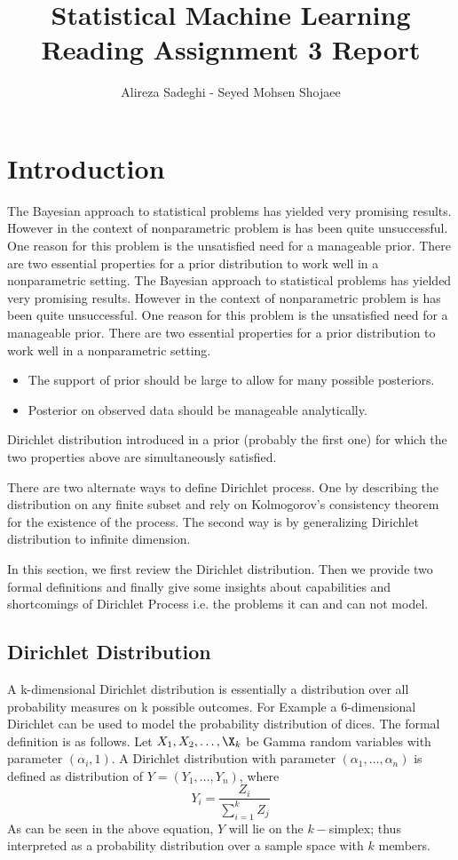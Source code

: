 \documentclass{article}
\title{Statistical Machine Learning \\ Reading Assignment 3 Report}
\author{Alireza Sadeghi - Seyed Mohsen Shojaee}
\begin{document}
\maketitle

\section{Introduction}
The Bayesian approach to statistical problems has yielded very promising results. However in the context
of nonparametric problem is has been quite unsuccessful. One reason for this problem is the unsatisfied need for a manageable prior.
There are two essential properties for a prior distribution to work well in a nonparametric setting.
The Bayesian approach to statistical problems has yielded very promising results. However in the context
of nonparametric problem is has been quite unsuccessful. One reason for this problem is the unsatisfied need for a manageable prior.
There are two essential properties for a prior distribution to work well in a nonparametric setting.
\begin{itemize}
  \item The support of prior should be large to allow for many possible posteriors.
\item Posterior on observed data should be manageable analytically.
\end{itemize}
Dirichlet distribution introduced in \cite{fegusen} a prior
(probably the first one) for which the two properties above are simultaneously satisfied.

There are two alternate ways to define Dirichlet process. One by
describing the distribution on any finite subset and rely on
Kolmogorov's consistency theorem for the existence of the process.
The second way is by generalizing Dirichlet distribution to infinite dimension.

In this section, we first review the Dirichlet distribution. Then we provide two formal definitions and finally
give some insights about capabilities and shortcomings of Dirichlet Process i.e. the problems it can and can not model.

\subsection{Dirichlet Distribution}
A k-dimensional Dirichlet distribution is essentially a distribution over all probability measures on k possible outcomes.
For Example a 6-dimensional Dirichlet can be used to model the probability distribution of dices.
The formal definition is as follows.
Let $X_1, X_2, \ldots, \X_k$ be Gamma random variables with parameter $(\alpha_i, 1)$. A Dirichlet distribution with
parameter $(\alpha_1, \ldots, \alpha_n)$  is defined as distribution of $ Y = (Y_1, \ldots, Y_n)$, where
\begin{equation}
  Y_i = \frac{Z_i}{\sum_{i=1}^k Z_j}
\end{equation}
As can be seen in the above equation, $Y$ will lie on the $k-$simplex;
thus interpreted as a probability distribution over a sample space with $k$ members.
\end{document}
